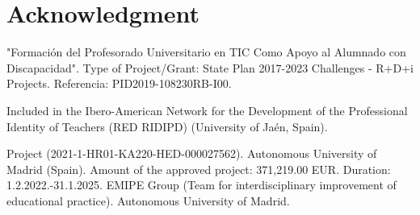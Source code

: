 \documentclass[english]{textolivre}
\begin{document}
\section{Acknowledgment}
"Formación del Profesorado Universitario en TIC Como Apoyo al Alumnado con Discapacidad". Type of Project/Grant: State Plan 2017-2023 Challenges - R+D+i Projects. Referencia: PID2019-108230RB-I00.

Included in the Ibero-American Network for the Development of the Professional Identity of Teachers (RED RIDIPD) (University of Jaén, Spain).

Project (2021-1-HR01-KA220-HED-000027562). Autonomous University of Madrid (Spain). Amount of the approved project: 371,219.00 EUR. Duration: 1.2.2022.-31.1.2025. EMIPE Group (Team for interdisciplinary improvement of educational practice). Autonomous University of Madrid.


\printbibliography\label{sec-bib}
\end{document}
